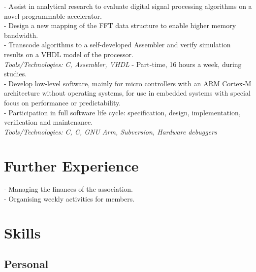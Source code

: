 \documentclass[11pt,a4paper]{moderncv}
\newcommand{\CC}{C\nolinebreak[4]\hspace{-.05em}\raisebox{.4ex}{\relsize{-3}{\textbf{++}}}}
\begin{document}
{ - Assist in analytical research to evaluate digital signal processing algorithms on a novel programmable accelerator.\\
    - Design a new mapping of the FFT data structure to enable higher memory bandwidth.\\
    - Transcode algorithms to a self-developed Assembler and verify simulation results on a VHDL model of the processor.\\
    \textit{Tools/Technologies: \CC{}, Assembler, VHDL}}
{ - Part-time, 16 hours a week, during studies.\\
	- Develop low-level software, mainly for micro controllers with an ARM Cortex-M architecture without operating systems, for use in embedded systems with special focus on performance or predictability.\\
	- Participation in full software life cycle: specification, design, implementation, verification and maintenance. \\
	\textit{Tools/Technologies: C, \CC{}, GNU Arm, Subversion, Hardware debuggers}}

\section{Further Experience}
{ - Managing the finances of the association.\\
	- Organising weekly activities for members.}

\section{Skills}

\subsection{Personal}
\end{document}
